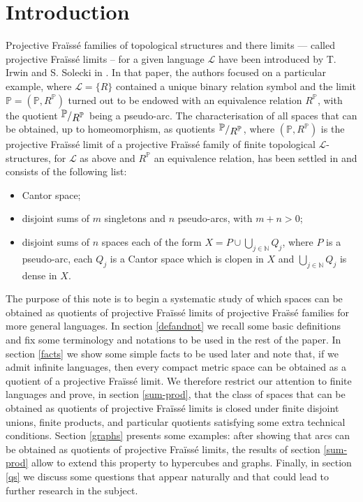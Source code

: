 \documentclass[12pt,twoside,a4paper]{amsart}
\theoremstyle{plain}
\theoremstyle{definition}
\begin{document}
\section{Introduction}
Projective Fra\"iss\'e families of topological structures and there limits --- called projective Fra\"iss\'e limits -- for a given language $ \mathcal L $ have been introduced by T. Irwin and S. Solecki in \cite{Irwin2006}.
In that paper, the authors focused on a particular example, where $ \mathcal L =\{ R\}$ contained a unique binary relation symbol and the limit $ \mathbb P =( \mathbb P ,R^{ \mathbb P })$ turned out to be endowed with an equivalence relation $R^{ \mathbb P }$, with the quotient $ {{\raisebox{.2em}{${ \mathbb P }\!$}\left/\raisebox{-.2em}{${R^{ \mathbb P }}$}\right.}} $ being a pseudo-arc.
The characterisation of all spaces that can be obtained, up to homeomorphism, as quotients $ {{\raisebox{.2em}{${ \mathbb P }\!$}\left/\raisebox{-.2em}{${R^{ \mathbb P }}$}\right.}} $, where $( \mathbb P ,R^{ \mathbb P})$ is the projective Fra\"iss\'e limit of a projective Fra\"iss\'e family of finite topological $ \mathcal L $-structures, for $ \mathcal L $ as above and $R^{ \mathbb P }$ an equivalence relation, has been settled in \cite{Camerl2010} and consists of the following list:
\begin{itemize}
\item Cantor space;
\item disjoint sums of $m$ singletons and $n$ pseudo-arcs, with $m+n>0$;
\item disjoint sums of $n$ spaces each of the form $X=P\cup\bigcup_{j\in {\mathbb N} }Q_j$, where $P$ is a pseudo-arc, each $Q_j$ is a Cantor space which is clopen in $X$ and $\bigcup_{j\in {\mathbb N} }Q_j$ is dense in $X$.
\end{itemize}
The purpose of this note is to begin a systematic study of which spaces can be obtained as quotients of projective Fra\"iss\'e limits of projective Fra\"ss\'e families for more general languages.
In section \ref{defandnot} we recall some basic definitions and fix some terminology and notations to be used in the rest of the paper.
In section \ref{facts} we show some simple facts to be used later and note that, if we admit infinite languages, then every compact metric space can be obtained as a quotient of a projective Fra\"iss\'e limit.
We therefore restrict our attention to finite languages and prove, in section \ref{sum-prod}, that the class of spaces that can be obtained as quotients of projective Fra\"iss\'e limits is closed under finite disjoint unions, finite products, and particular quotients satisfying some extra technical conditions.
Section \ref{graphs} presents some examples: after showing that arcs can be obtained as quotients of projective Fra\"iss\'e limits, the results of section \ref{sum-prod} allow to extend this property to hypercubes and graphs.
Finally, in section \ref{qs} we discuss some questions that appear naturally and that could lead to further research in the subject.
\end{document}
